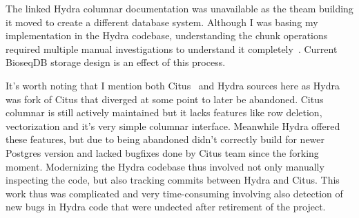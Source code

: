 
The linked Hydra columnar documentation was unavailable as the theam building it moved to create a different database system. 
Although I was basing my implementation in the Hydra codebase, understanding the chunk operations required multiple manual investigations to understand it completely~\autocite{hydra_columnar_source}.
Current BioseqDB storage design is an effect of this process.

It's worth noting that I mention both Citus~\autocite{citus_distributed_2021} and Hydra sources here as Hydra was fork of Citus that diverged at some point to later be abandoned. Citus columnar is still actively maintained but it lacks features like row deletion, vectorization and it's very simple columnar interface.
Meanwhile Hydra offered these features, but due to being abandoned didn't correctly build for newer Postgres version and lacked bugfixes done by Citus team since the forking moment.
Modernizing the Hydra codebase thus involved not only manually inspecting the code, but also tracking commits between Hydra and Citus. This work thus was complicated and very time-consuming involving also detection of new bugs in Hydra code that were undected after retirement of the project.
